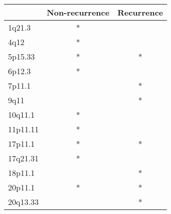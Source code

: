 \begin{tabular}{lcc}
\toprule
{} & Non-recurrence & Recurrence \\
\midrule
1q21.3   &              * &            \\
4q12     &              * &            \\
5p15.33  &              * &          * \\
6p12.3   &              * &            \\
7p11.1   &                &          * \\
9q11     &                &          * \\
10q11.1  &              * &            \\
11p11.11 &              * &            \\
17p11.1  &              * &          * \\
17q21.31 &              * &            \\
18p11.1  &                &          * \\
20p11.1  &              * &          * \\
20q13.33 &                &          * \\
\bottomrule
\end{tabular}
